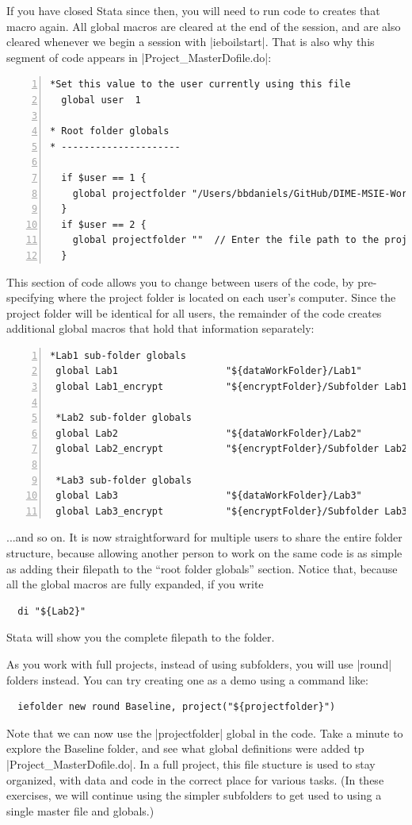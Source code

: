 \documentclass{tufte-handout}
\begin{document}
If you have closed Stata since then,
you will need to run code to creates that macro again.
All global macros are cleared at the end of the session,
and are also cleared whenever we begin a session with |ieboilstart|.
That is also why this segment of code appears in |Project_MasterDofile.do|:
\begin{Verbatim}[frame=leftline,numbers=left]
*Set this value to the user currently using this file
  global user  1

* Root folder globals
* ---------------------

  if $user == 1 {
    global projectfolder "/Users/bbdaniels/GitHub/DIME-MSIE-Workshop/Material/Labs/Stata-Track-2"
  }
  if $user == 2 {
    global projectfolder ""  // Enter the file path to the project folder for the next user here
  }
\end{Verbatim}
This section of code allows you to change between
users of the code, by pre-specifying where the project folder
is located on each user's computer.
Since the project folder will be identical for all users,
the remainder of the code creates additional global macros
that hold that information separately:
\begin{Verbatim}[frame=leftline,numbers=left]
 *Lab1 sub-folder globals
 global Lab1                   "${dataWorkFolder}/Lab1"
 global Lab1_encrypt           "${encryptFolder}/Subfolder Lab1 Encrypted"

 *Lab2 sub-folder globals
 global Lab2                   "${dataWorkFolder}/Lab2"
 global Lab2_encrypt           "${encryptFolder}/Subfolder Lab2 Encrypted"

 *Lab3 sub-folder globals
 global Lab3                   "${dataWorkFolder}/Lab3"
 global Lab3_encrypt           "${encryptFolder}/Subfolder Lab3 Encrypted"
\end{Verbatim}
...and so on. It is now straightforward for multiple users
to share the entire folder structure,
because allowing another person to work
on the same code is as simple as adding their filepath
to the ``root folder globals'' section.
Notice that, because all the global macros are fully expanded,
if you write
\begin{Verbatim}
  di "${Lab2}"
\end{Verbatim}
Stata will show you the complete filepath to the folder.

As you work with full projects,
instead of using subfolders,
you will use |round| folders instead.
You can try creating one as a demo using a command like:
\begin{Verbatim}
  iefolder new round Baseline, project("${projectfolder}")
\end{Verbatim}
Note that we can now use the |projectfolder| global in the code.
Take a minute to explore the Baseline folder,
and see what global definitions were added tp |Project_MasterDofile.do|.
In a full project, this file stucture is used to stay organized,
with data and code in the correct place for various tasks.
(In these exercises, we will continue using the simpler subfolders
to get used to using a single master file and globals.)
\end{document}
